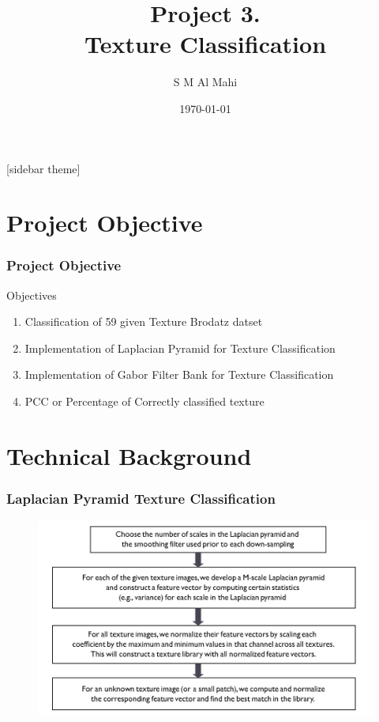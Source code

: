 \documentclass[11pt]{beamer}
\author{S M Al Mahi}
\title[ECEN-5283 Computer Vision]{Project 3. \\ Texture Classification}
\institute{Oklahoma State University}
\date{\today}
\begin{document}
\begin{frame}
\titlepage
\end{frame}

\newpage
{}[sidebar theme]
\section{Project Objective}
\begin{frame}
\frametitle{Project Objective}
	\begin{block}{Objectives}
	\begin{enumerate}
		\item Classification of 59 given Texture Brodatz datset
		\item Implementation of Laplacian Pyramid for Texture Classification
		\item Implementation of Gabor Filter Bank for Texture Classification
		\item PCC or Percentage of Correctly classified texture 
	\end{enumerate}
	\end{block}
\end{frame}

\section{Technical Background}
\begin{frame}
\frametitle{Laplacian Pyramid Texture Classification}
\begin{figure}
\includegraphics[width=\textwidth]{lap-flow.png}
\end{figure}
\end{frame}
\end{document}
